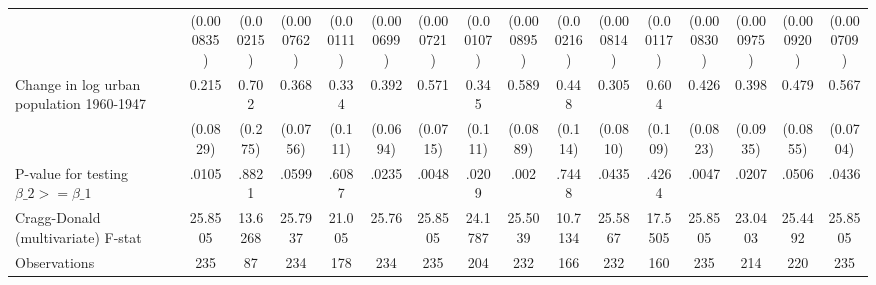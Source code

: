{\begin{tabular}{l*{15}{c}}
                &(0.000835)         &(0.00215)         &(0.000762)         &(0.00111)         &(0.000699)         &(0.000721)         &(0.00107)         &(0.000895)         &(0.00216)         &(0.000814)         &(0.00117)         &(0.000830)         &(0.000975)         &(0.000920)         &(0.000709)         \\
[1em]
Change in log urban population 1960-1947&    0.215\sym{**} &    0.702\sym{**} &    0.368\sym{***}&    0.334\sym{***}&    0.392\sym{***}&    0.571\sym{***}&    0.345\sym{***}&    0.589\sym{***}&    0.448\sym{***}&    0.305\sym{***}&    0.604\sym{***}&    0.426\sym{***}&    0.398\sym{***}&    0.479\sym{***}&    0.567\sym{***}\\
                & (0.0829)         &  (0.275)         & (0.0756)         &  (0.111)         & (0.0694)         & (0.0715)         &  (0.111)         & (0.0889)         &  (0.114)         & (0.0810)         &  (0.109)         & (0.0823)         & (0.0935)         & (0.0855)         & (0.0704)         \\
\hline
P-value for testing $\beta\_{2} >= \beta\_{1}$&    .0105         &    .8821         &    .0599         &    .6087         &    .0235         &    .0048         &    .0209         &     .002         &    .7448         &    .0435         &    .4264         &    .0047         &    .0207         &    .0506         &    .0436         \\
Cragg-Donald (multivariate) F-stat&  25.8505         &  13.6268         &  25.7937         &   21.005         &    25.76         &  25.8505         &  24.1787         &  25.5039         &  10.7134         &  25.5867         &  17.5505         &  25.8505         &  23.0403         &  25.4492         &  25.8505         \\
Observations    &      235         &       87         &      234         &      178         &      234         &      235         &      204         &      232         &      166         &      232         &      160         &      235         &      214         &      220         &      235         \\
\hline\hline
\end{tabular}
}
